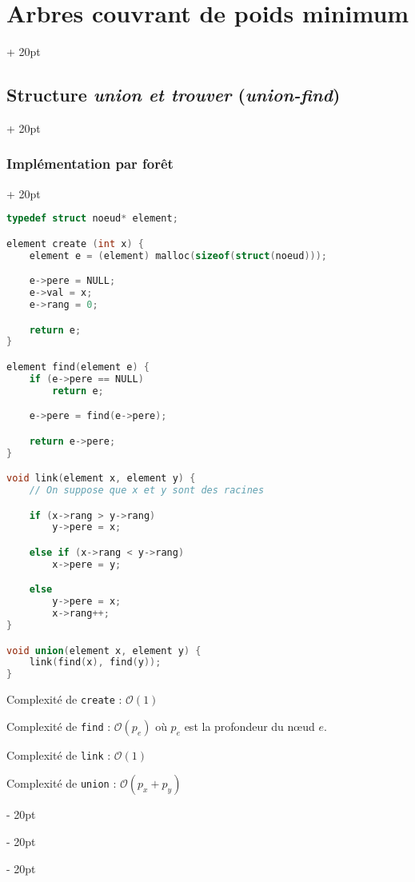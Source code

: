 \documentclass[a4paper, 12pt, twoside]{article}
\newcommand{\ind}[1][20pt]{\advance\leftskip + #1}
\newcommand{\deind}[1][20pt]{\advance\leftskip - #1}
\newenvironment{indt}[2][20pt]{#2 \par \ind[#1]}{\par \deind} %
\begin{document}
\begin{indt}{\section{Arbres couvrant de poids minimum}}
\begin{indt}{\subsection{Structure \textit{union et trouver} (\textit{union-find})}}
\begin{indt}{\subsubsection{Implémentation par forêt}}
\begin{lstlisting}[language=C, xleftmargin=80pt]
typedef struct noeud* element;

element create (int x) {
    element e = (element) malloc(sizeof(struct(noeud)));

    e->pere = NULL;
    e->val = x;
    e->rang = 0;

    return e;
}

element find(element e) {
    if (e->pere == NULL)
        return e;

    e->pere = find(e->pere);

    return e->pere;
}

void link(element x, element y) {
    // On suppose que x et y sont des racines

    if (x->rang > y->rang)
        y->pere = x;

    else if (x->rang < y->rang)
        x->pere = y;

    else
        y->pere = x;
        x->rang++;
}

void union(element x, element y) {
    link(find(x), find(y));
}\end{lstlisting}

                Complexité de \texttt{create} : $\mathcal O(1)$

                Complexité de \texttt{find} : $\mathcal O(p_e)$ où $p_e$ est la profondeur du n\oe ud $e$.

                Complexité de \texttt{link} : $\mathcal O(1)$

                Complexité de \texttt{union} : $\mathcal O(p_x + p_y)$

                \vspace{12pt}
                

\end{indt}
\end{indt}
\end{indt}
\end{document}
